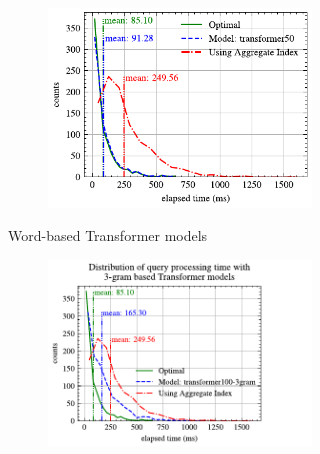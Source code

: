 \documentclass[conference]{IEEEtran}
\begin{document}
\begin{figure}[p]
\begin{subfigure}{0.45\textwidth}
\begin{subfigure}{\textwidth}
		\end{subfigure}
		\vfill
		\begin{subfigure}{\textwidth}
			\centering
			\includegraphics[]{graphics/perf_dist_transformer50_A.pdf}
		\end{subfigure}
		\caption{Word-based Transformer models}
	\end{subfigure}
	\hfill
	\begin{subfigure}{0.45\textwidth}
		\begin{subfigure}{\textwidth}
			\centering
			\includegraphics[]{graphics/perf_dist_transformer100_3gram_A.pdf}
		\end{subfigure}
		\vfill
		\begin{subfigure}{\textwidth}
			\centering

\end{subfigure}
\end{subfigure}
\end{figure}
\end{document}
